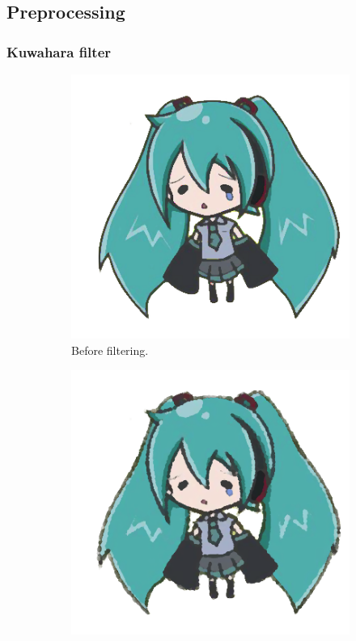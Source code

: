 \subsection{Preprocessing}
\subsubsection{Kuwahara filter}
\begin{figure}[htb!]
\centering
\begin{subfigure}{.24\textwidth}
\includegraphics[width=\textwidth]{images/miku_d.png}
\caption{Before filtering.}
\end{subfigure}
\begin{subfigure}{.24\textwidth}
\includegraphics[width=\textwidth]{images/miku_d_filtered_smallh.png}

\end{subfigure}
\end{figure}
